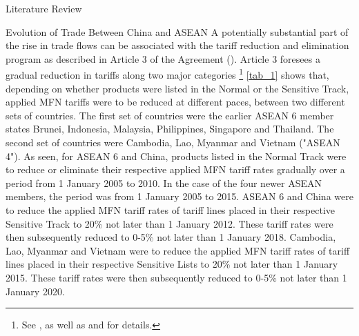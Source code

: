\begin{section}{Literature Review}
\begin{subsection}{Evolution of Trade Between China and ASEAN}
A potentially substantial part of the rise in trade flows can be associated with the tariff reduction and elimination program as described in Article 3 of the Agreement (\cite{asean_2002_1}). Article 3 foresees a gradual reduction in tariffs along two major categories \footnote{See \cite{asean_2002_4}, as well as \cite{asean_2002_2} and \cite{asean_2002_3} for details.} \autoref{tab_1} shows that, depending on whether products were listed in the Normal or the Sensitive Track, applied MFN tariffs were to be reduced at different paces, between two different sets of countries. The first set of countries were the earlier ASEAN 6 member states Brunei, Indonesia, Malaysia, Philippines, Singapore and Thailand. The second set of countries were Cambodia, Lao, Myanmar and Vietnam ("ASEAN 4"). As seen, for ASEAN 6 and China, products listed in the Normal Track were to reduce or eliminate their respective applied MFN tariff rates gradually over a period from 1 January 2005 to 2010. In the case of the four newer ASEAN members, the period was from 1 January 2005 to 2015. ASEAN 6 and China were to reduce the applied MFN tariff rates of tariff lines placed in their respective Sensitive Track to 20\% not later than 1 January 2012. These tariff rates were then subsequently reduced to 0-5\% not later than 1 January 2018. Cambodia, Lao, Myanmar and Vietnam were to reduce the applied MFN tariff rates of tariff lines placed in their respective Sensitive Lists to 20\% not later than 1 January 2015. These tariff rates were then subsequently reduced to 0-5\% not later than 1 January 2020. 


\end{subsection}
\end{section}
